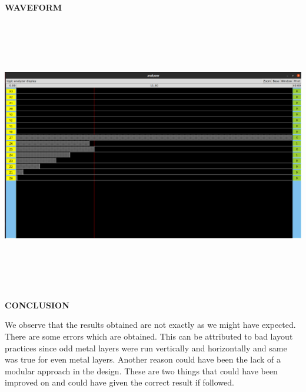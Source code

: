 \documentclass[12pt]{report}
\begin{document}
\newpage
	\begin{flushleft}
		\begin{Large}
			\textbf{WAVEFORM}
		\end{Large}
	\end{flushleft}
\begin{center}
\includegraphics[height=12cm, width=15cm]{Waveform}
\end{center}
\vspace{4pt}
	\begin{flushleft}
		\begin{Large}
			\textbf{CONCLUSION}
		\end{Large}
	\end{flushleft}
We observe that the results obtained are not exactly as we might have expected. There are some errors which are obtained. This can be attributed to bad layout practices since odd metal layers were run vertically and horizontally and same was true for even metal layers. Another reason could have been the lack of a modular approach in the design. These are two things that could have been improved on and could have given the correct result if followed.
\end{document}
